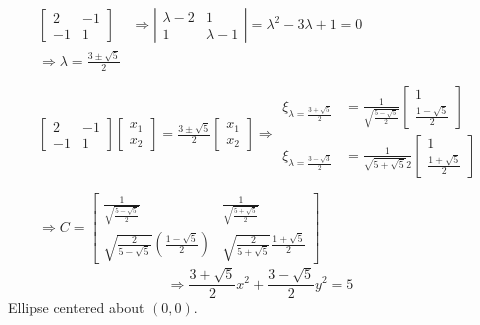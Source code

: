 \documentclass[twoside]{amsart}
\theoremstyle{plain}
\theoremstyle{definition}
\begin{document}
\[
\begin{gathered}
  \left[ \begin{matrix} 2 & -1 \\ -1 & 1 \end{matrix} \right]  \quad \, \Longrightarrow \left| \begin{matrix} \lambda -2 & 1 \\ 1 & \lambda - 1 \end{matrix} \right| = \lambda^2 -3 \lambda + 1 = 0 \\
  \Longrightarrow \lambda = \frac{3 \pm \sqrt{5}}{2} \\ 
  \quad \, \\
  \left[ \begin{matrix} 2 & -1 \\ -1 & 1 \end{matrix} \right] \left[ \begin{matrix} x_1 \\ x_2 \end{matrix} \right] = \frac{3 \pm \sqrt{5}}{2} \left[ \begin{matrix} x_1 \\ x_2 \end{matrix} \right]  \Longrightarrow \begin{aligned} \xi_{\lambda = \frac{ 3 + \sqrt{5}}{2} } & = \frac{1}{ \sqrt{ \frac{ 5 - \sqrt{5}}{2} } } \left[ \begin{matrix} 1 \\ \frac{1- \sqrt{5}}{2} \end{matrix} \right]  \\
    \xi_{ \lambda = \frac{3- \sqrt{3}}{2} } & = \frac{1}{ \sqrt{ 5 + \sqrt{5}}{2} } \left[ \begin{matrix} 1 \\ \frac{1 + \sqrt{5}}{2} \end{matrix} \right] \\
\end{aligned} \\
  \Longrightarrow C = \left[ \begin{matrix} \frac{1 }{\sqrt{ \frac{ 5 - \sqrt{5}}{2} }} & \frac{1}{ \sqrt{ \frac{ 5 + \sqrt{5}}{2} } } \\ \sqrt{ \frac{2}{ 5 - \sqrt{5}} } \left( \frac{1 - \sqrt{5}}{2} \right) & \sqrt{\frac{2}{5 + \sqrt{5}} } \frac{1+ \sqrt{5}}{2} \end{matrix} \right]
\end{gathered}
\]
\[
\Longrightarrow \frac{3+\sqrt{5}}{2} x^2 + \frac{ 3 - \sqrt{5}}{2} y^2 = 5 
\]
Ellipse centered about $(0,0)$.  
\end{document}
